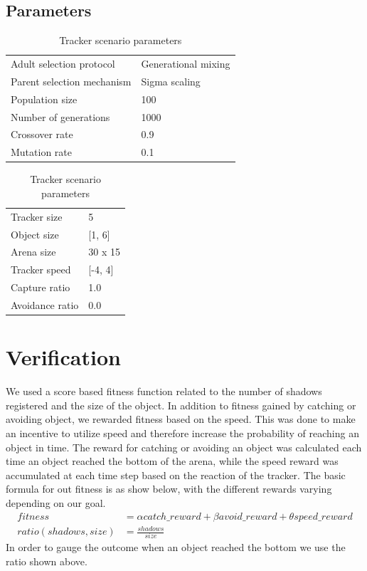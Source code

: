 \documentclass[10pt]{article}
\begin{document}
	\subsection{Parameters}
		\begin{table}[H]
			\parbox{.45\linewidth}{
				\centering
				\begin{tabular}{ll}
					Adult selection protocol & Generational mixing\\
					Parent selection mechanism & Sigma scaling\\
					Population size & 100\\
					Number of generations & 1000\\
					Crossover rate & 0.9\\
					Mutation rate & 0.1
				\end{tabular}
				\caption{Evolution algorithm parameters}
			}
			\hfill
			\parbox{.45\linewidth}{
				\centering
				\begin{tabular}{ll}
					Tracker size & 5\\
					Object size & [1, 6]\\
					Arena size & 30 x 15\\
					Tracker speed & [-4, 4]\\
					Capture ratio & 1.0\\
					Avoidance ratio & 0.0
				\end{tabular}
				\caption{Tracker scenario parameters}
			}
		\end{table}
\section{Verification}
	We used a score based fitness function related to the number of shadows registered and the size of the object. In addition to fitness gained by catching or avoiding object, we rewarded fitness based on the speed. This was done to make an incentive to utilize speed and therefore increase the probability of reaching an object in time. The reward for catching or avoiding an object was calculated each time an object reached the bottom of the arena, while the speed reward was accumulated at each time step based on the reaction of the tracker. The basic formula for out fitness is as show below, with the different rewards varying depending on our goal.
	\begin{align}
		fitness &= \alpha catch\_reward+\beta avoid\_reward+\theta speed\_reward\nonumber\\
		ratio(shadows, size) &= \frac{shadows}{size}\nonumber
	\end{align}
In order to gauge the outcome when an object reached the bottom we use the ratio shown above.
\end{document}
